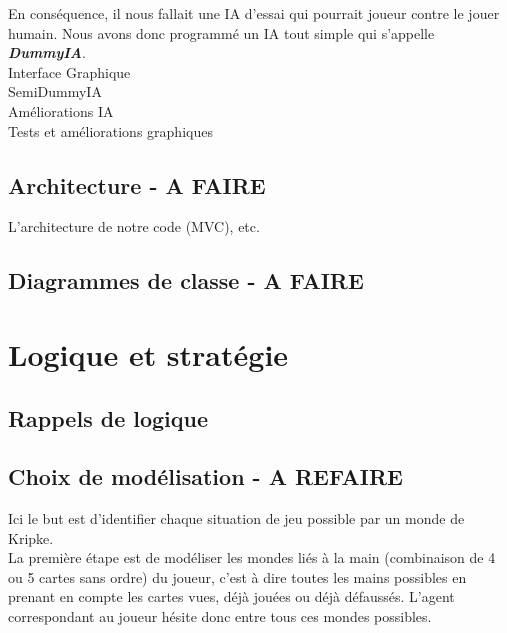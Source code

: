 \documentclass[11pt, letterpaper]{article}
\begin{document}
\noindent En conséquence, il nous fallait une IA d'essai qui pourrait joueur contre le jouer humain. Nous avons donc programmé un IA tout simple qui s'appelle \textbf{\textit{DummyIA}}.\\

\noindent Interface Graphique\\

\noindent SemiDummyIA\\

\noindent Améliorations IA\\

\noindent Tests et améliorations graphiques\\


\subsection{Architecture - A FAIRE}

\noindent
L'architecture de notre code (MVC), etc.

\subsection{Diagrammes de classe - A FAIRE}


\section{Logique et stratégie}

\subsection{Rappels de logique}

\subsection{Choix de modélisation - A REFAIRE}\label{modelisation}

\noindent
Ici le but est d'identifier chaque situation de jeu possible par un monde de Kripke.\\

\noindent
La première étape est de modéliser les mondes liés à la main (combinaison de 4 ou 5 cartes sans ordre) du joueur, c'est à dire toutes les mains possibles en prenant en compte les cartes vues, déjà jouées ou déjà défaussés. L'agent correspondant au joueur hésite donc entre tous ces mondes possibles.\\
\end{document}
